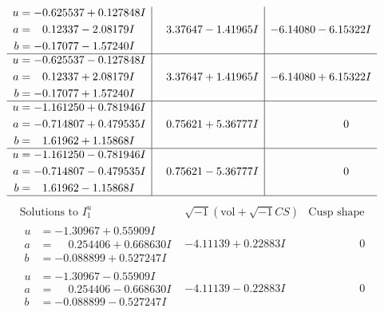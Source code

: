 \documentclass[1p]{elsarticle_modified}
\theoremstyle{definition}
\newcommand{\I}{\sqrt{-1}}
\begin{document}
$$\begin{array}{c|c|c}
\begin{aligned}
u &= -0.625537 + 0.127848 I \\
a &= \phantom{-}0.12337 - 2.08179 I \\
b &= -0.17077 - 1.57240 I\end{aligned}
 & \phantom{-}3.37647 - 1.41965 I & -6.14080 - 6.15322 I \\ \hline\begin{aligned}
u &= -0.625537 - 0.127848 I \\
a &= \phantom{-}0.12337 + 2.08179 I \\
b &= -0.17077 + 1.57240 I\end{aligned}
 & \phantom{-}3.37647 + 1.41965 I & -6.14080 + 6.15322 I \\ \hline\begin{aligned}
u &= -1.161250 + 0.781946 I \\
a &= -0.714807 + 0.479535 I \\
b &= \phantom{-}1.61962 + 1.15868 I\end{aligned}
 & \phantom{-}0.75621 + 5.36777 I & \phantom{-0.000000 } 0 \\ \hline\begin{aligned}
u &= -1.161250 - 0.781946 I \\
a &= -0.714807 - 0.479535 I \\
b &= \phantom{-}1.61962 - 1.15868 I\end{aligned}
 & \phantom{-}0.75621 - 5.36777 I & \phantom{-0.000000 } 0\\
 \hline 
 \end{array}$$\newpage$$\begin{array}{c|c|c}  
\text{Solutions to }I^u_{1}& \I (\text{vol} + \sqrt{-1}CS) & \text{Cusp shape}\\
 \hline 
\begin{aligned}
u &= -1.30967 + 0.55909 I \\
a &= \phantom{-}0.254406 + 0.668630 I \\
b &= -0.088899 + 0.527247 I\end{aligned}
 & -4.11139 + 0.22883 I & \phantom{-0.000000 } 0 \\ \hline\begin{aligned}
u &= -1.30967 - 0.55909 I \\
a &= \phantom{-}0.254406 - 0.668630 I \\
b &= -0.088899 - 0.527247 I\end{aligned}
 & -4.11139 - 0.22883 I & \phantom{-0.000000 } 0 \\ \hline\begin{aligned}

\end{aligned}
\end{array}$$
\end{document}
